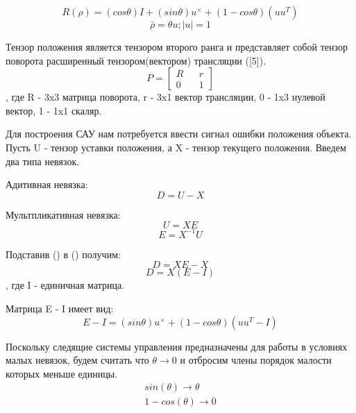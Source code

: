 \documentclass[a4paper]{article}
\begin{document}
\begin{equation}
R(\rho) = (cos \theta) I + (sin \theta)u^{\times} + (1-cos \theta)(uu^T)
\end{equation}
\begin{equation} \bar{\rho} = \theta u; |u| = 1 \end{equation}

Тензор положения является тензором второго ранга и представляет собой тензор поворота расширенный тензором(вектором) трансляции ([5]).
\begin{equation}
P = \begin{bmatrix}R&&r\\0&&1\end{bmatrix}
\end{equation}
, где R - 3x3 матрица поворота, r - 3x1 вектор трансляции, 0 - 1x3 нулевой вектор, 1 - 1x1 скаляр.  

Для построения САУ нам потребуется ввести сигнал ошибки положения объекта. 
Пусть U - тензор уставки положения, а X - тензор текущего положения.
Введем два типа невязок.

Адитивная невязка:
\begin{equation}
D = U - X
\end{equation}

Мультпликативная невязка:
\begin{equation} U = XE 		\end{equation}
\begin{equation} E = X^{-1}U 	\end{equation}

Подставив () в () получим:
\begin{equation} D = XE - X 	\end{equation}
\begin{equation} D = X(E - I)	\end{equation}
, где I - единичная матрица.

Матрица E - I имеет вид:
\begin{equation} E - I = (sin \theta)u^{\times} + (1 - cos \theta)(uu^T - I) \end{equation}

Поскольку следящие системы управления предназначены для работы в условиях малых невязок, будем считать что $\theta \rightarrow 0$ и отбросим члены порядок малости которых меньше единицы.
\begin{eqnarray}
sin(\theta) \rightarrow \theta\\
1 - cos(\theta) \rightarrow 0
\end{eqnarray}
\end{document}
